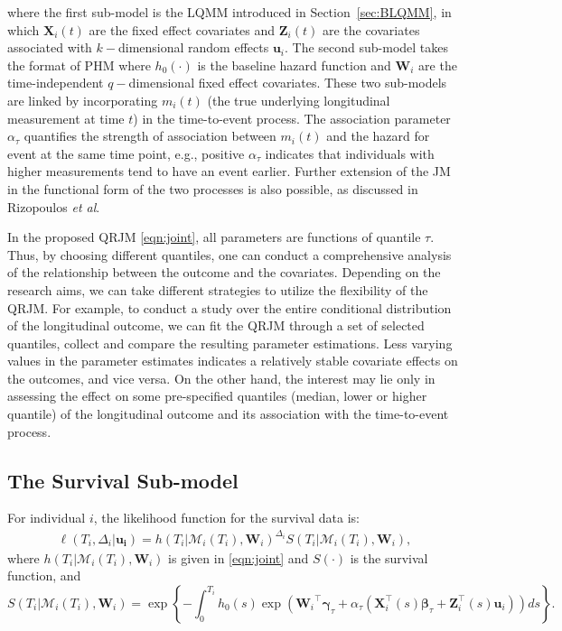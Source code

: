 \documentclass[Crown, sagev, times, doublespace]{sagej}
\begin{document}
where the first sub-model is the LQMM introduced in Section~\ref{sec:BLQMM}, in which $\boldsymbol{X}_{i}(t)$ are the fixed effect covariates and $\boldsymbol{Z}_{i}(t)$ are the covariates associated with $k-$dimensional random effects $\boldsymbol{u}_i$. The second sub-model takes the format of PHM where $h_0(\cdot)$ is the baseline hazard function and $\boldsymbol{W}_{i}$ are the time-independent $q-$dimensional fixed effect covariates. These two sub-models are linked by incorporating $m_i(t)$ (the true underlying longitudinal measurement at time $t$) in the time-to-event process. The association parameter $\alpha_{\tau}$ quantifies the strength of association between $m_i(t)$ and the hazard for event at the same time point, e.g., positive $\alpha_{\tau}$ indicates that individuals with higher measurements tend to have an event earlier. Further extension of the JM in the functional form of the two processes is also possible, as discussed in Rizopoulos \emph{et al}.\cite{rizopoulos2014combining}

In the proposed QRJM \eqref{eqn:joint}, all parameters are functions of quantile $\tau$. Thus, by choosing different quantiles, one can conduct a comprehensive analysis of the relationship between the outcome and the covariates. Depending on the research aims, we can take different strategies to utilize the flexibility of the QRJM. For example, to conduct a study over the entire conditional distribution of the longitudinal outcome, we can fit the QRJM through a set of selected quantiles, collect and compare the resulting parameter estimations. Less varying values in the parameter estimates indicates a relatively stable covariate effects on the outcomes, and vice versa. On the other hand, the interest may lie only in assessing the effect on some pre-specified quantiles (median, lower or higher quantile) of the longitudinal outcome and its association with the time-to-event process.

\subsection{The Survival Sub-model}\label{sec:surv_submodel}
For individual $i$, the likelihood function for the survival data is:
\begin{eqnarray}\label{eqn:survival_like}
\ell(T_i, \Delta_i|\boldsymbol{{\boldsymbol u}_i}) =h(T_i|\mathcal{M}_{i}(T_i), \boldsymbol{W}_i)^{\Delta_i}S(T_i|\mathcal{M}_{i}(T_i), \boldsymbol{W}_i),
\end{eqnarray}
where $h(T_i|\mathcal{M}_{i}(T_i), \boldsymbol{W}_i)$ is given in \eqref{eqn:joint} and $S(\cdot)$ is the survival function, and
\begin{equation*}
S(T_i|\mathcal{M}_{i}(T_i), \boldsymbol{W}_i)=\exp\left\{-\int_0^{T_i}h_0(s)\exp({\boldsymbol W_i}^{\top}\boldsymbol{\gamma}_{\tau} + \alpha_{\tau}({\boldsymbol X}_i^{\top}(s)\boldsymbol{\beta}_{\tau} + {\boldsymbol Z}_i^{\top}(s){\boldsymbol u}_{i}))ds\right\}.
\end{equation*}
\end{document}
